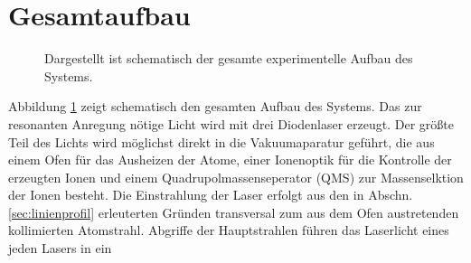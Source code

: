 \section{Gesamtaufbau}\label{sec:gesamtaufbau}
\begin{figure}[h]
 	\centering
	\caption[Gesamter experimenteller Aufbau, schematisch]{Dargestellt ist
	schematisch der gesamte experimentelle Aufbau des Systems.}\label{fig:experimenteller_aufbau_gesamt}
\end{figure}
Abbildung \ref{fig:experimenteller_aufbau_gesamt} zeigt schematisch den gesamten
Aufbau des Systems. Das zur resonanten Anregung nötige Licht wird mit drei
Diodenlaser erzeugt. Der größte Teil des Lichts wird möglichst
direkt in die Vakuumaparatur geführt, die aus einem Ofen für das Ausheizen der
Atome, einer Ionenoptik für die Kontrolle der erzeugten Ionen und einem
Quadrupolmassenseperator (QMS) zur Massenselktion der Ionen besteht.
Die Einstrahlung der Laser erfolgt aus den in Abschn. \ref{sec:linienprofil}
erleuterten Gründen transversal zum aus dem Ofen austretenden kollimierten Atomstrahl.
Abgriffe der Hauptstrahlen führen das Laserlicht eines jeden Lasers in ein
